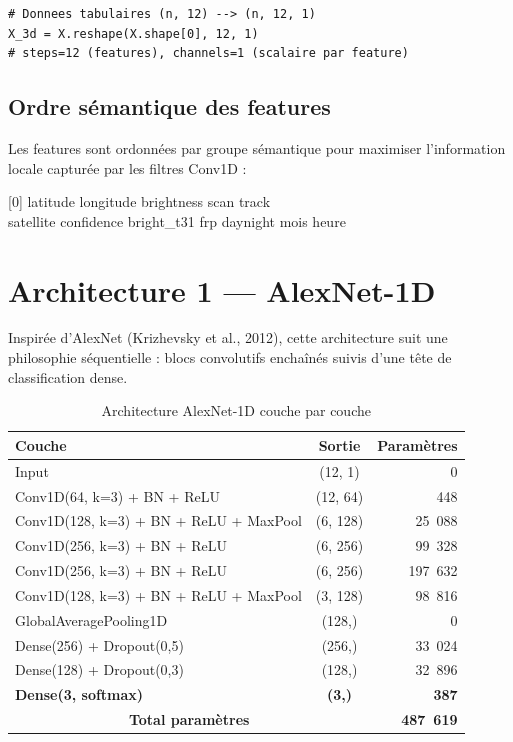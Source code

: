 \documentclass[12pt,a4paper]{report}
\begin{document}
\begin{lstlisting}[style=python, caption={Reshape pour Conv1D}]
# Donnees tabulaires (n, 12) --> (n, 12, 1)
X_3d = X.reshape(X.shape[0], 12, 1)
# steps=12 (features), channels=1 (scalaire par feature)
\end{lstlisting}

\subsection{Ordre s\'{e}mantique des features}

Les features sont ordonn\'{e}es par groupe s\'{e}mantique pour maximiser l'information locale captur\'{e}e par les filtres Conv1D :

\begin{center}
\small
[0] latitude \quad [1] longitude \quad [2] brightness \quad [3] scan \quad [4] track\\
[5] satellite \quad [6] confidence \quad [7] bright\_t31 \quad [8] frp \quad [9] daynight \quad [10] mois \quad [11] heure
\end{center}

\section{Architecture 1 --- AlexNet-1D}

Inspir\'{e}e d'AlexNet (Krizhevsky et al., 2012), cette architecture suit une philosophie s\'{e}quentielle : blocs convolutifs enchaîn\'{e}s suivis d'une t\^{e}te de classification dense.

\begin{table}[H]
\centering
\small
\begin{tabular}{|l|c|r|}
\hline
\rowcolor{bleu!15}
\textbf{Couche} & \textbf{Sortie} & \textbf{Param\`{e}tres} \\
\hline
Input & (12, 1) & 0 \\
\hline
Conv1D(64, k=3) + BN + ReLU & (12, 64) & 448 \\
\hline
Conv1D(128, k=3) + BN + ReLU + MaxPool & (6, 128) & 25~088 \\
\hline
Conv1D(256, k=3) + BN + ReLU & (6, 256) & 99~328 \\
\hline
Conv1D(256, k=3) + BN + ReLU & (6, 256) & 197~632 \\
\hline
Conv1D(128, k=3) + BN + ReLU + MaxPool & (3, 128) & 98~816 \\
\hline
GlobalAveragePooling1D & (128,) & 0 \\
\hline
Dense(256) + Dropout(0,5) & (256,) & 33~024 \\
\hline
Dense(128) + Dropout(0,3) & (128,) & 32~896 \\
\hline
\textbf{Dense(3, softmax)} & \textbf{(3,)} & \textbf{387} \\
\hline
\multicolumn{2}{|c|}{\textbf{Total param\`{e}tres}} & \textbf{487~619} \\
\hline
\end{tabular}
\caption{Architecture AlexNet-1D couche par couche}
\label{tab:alexnet_arch}
\end{table}
\end{document}
